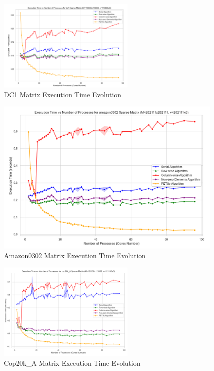 \documentclass[12pt,oneside]{book} %
\begin{document}
\begin{figure}[H]
    \centering
    \includegraphics[width=0.6\textwidth]{../results/matrix_dim/dc1_k6_execution_time.png}
    \caption{DC1 Matrix Execution Time Evolution}\label{fig:dc1-k6-execution-time}
\end{figure}

\begin{figure}[H]
    \centering
    \includegraphics[width=0.6\linewidth]{../results/matrix_dim/amazon0302_k6_execution_time.png}
    \caption{Amazon0302 Matrix Execution Time Evolution}\label{fig:amazon0302-k6-execution-time}
\end{figure}

\begin{figure}[H]
    \centering
    \includegraphics[width=0.6\textwidth]{../results/matrix_dim/cop20k_A_k6_execution_time.png}
    \caption{Cop20k\_A Matrix Execution Time Evolution}\label{fig:cop20k-a-k6-execution-time}
\end{figure}
\end{document}
